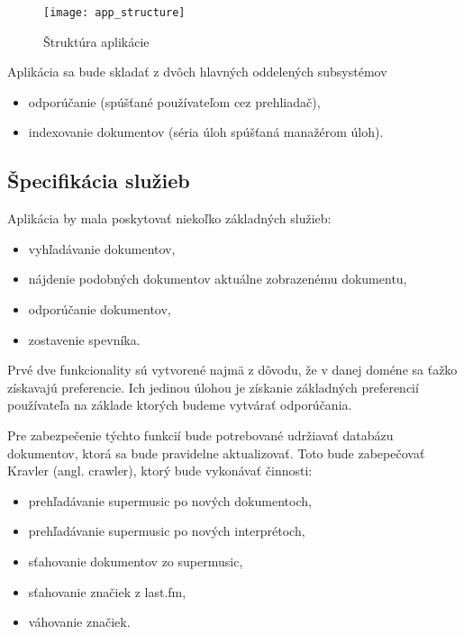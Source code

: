 \begin{figure}
    \begin{center}
        \texttt{[image: app\_structure]}
        \caption{Štruktúra aplikácie}
        \label{fig:app_structure}
    \end{center}
\end{figure}

Aplikácia sa bude skladať z dvôch hlavných oddelených subsystémov

\begin{itemize}
\item{odporúčanie (spúšťané používateľom cez prehliadač),}
\item{indexovanie dokumentov (séria úloh spúšťaná manažérom úloh).}
\end{itemize}

\subsection{Špecifikácia služieb}

Aplikácia by mala poskytovať niekoľko základných služieb:

\begin{itemize}
\item{vyhľadávanie dokumentov,}
\item{nájdenie podobných dokumentov aktuálne zobrazenému dokumentu,}
\item{odporúčanie dokumentov,}
\item{zostavenie spevníka.}
\end{itemize}

Prvé dve funkcionality sú vytvorené najmä z dôvodu, že v danej doméne 
sa ťažko získavajú preferencie. Ich jedinou úlohou je získanie základných
preferencií používateľa na základe ktorých budeme vytvárať odporúčania.

Pre zabezpečenie týchto funkcií bude potrebované udržiavať databázu dokumentov,
ktorá sa bude pravidelne aktualizovať. Toto bude zabepečovať Kravler (angl. crawler),
ktorý bude vykonávať činnosti:

\begin{itemize}
\item{prehľadávanie supermusic po nových dokumentoch,}
\item{prehľadávanie supermusic po nových interprétoch,}
\item{sťahovanie dokumentov zo supermusic,}
\item{sťahovanie značiek z last.fm,}
\item{váhovanie značiek.}
\end{itemize}


